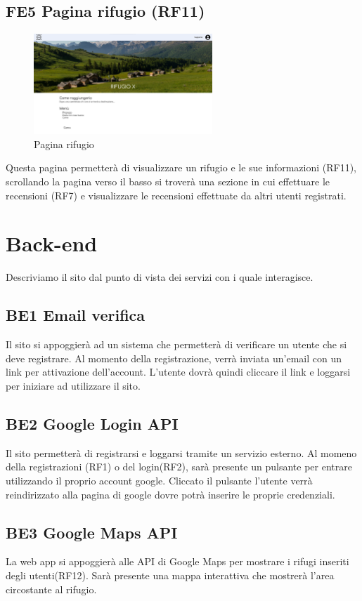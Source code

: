 \documentclass[a4paper,12pt]{article}
\begin{document}
\subsection*{FE5 Pagina rifugio (RF11)}
\begin{figure}[H]
   \centering
    \includegraphics[width=0.6\textwidth]{img/Pagina rifugio.png}
    \caption{Pagina rifugio}
\end{figure}
Questa pagina permetterà di visualizzare un rifugio e le sue informazioni (RF11), scrollando la pagina verso il basso si troverà una sezione in cui effettuare le recensioni (RF7) e visualizzare le recensioni effettuate da altri utenti registrati.


\newpage
\section{Back-end}

Descriviamo il sito dal punto di vista dei servizi con i quale interagisce.

\subsection*{BE1 Email verifica}
Il sito si appoggierà ad un sistema che permetterà di verificare un utente che si deve registrare. Al momento della registrazione, verrà inviata un'email con un link per attivazione dell'account. L'utente dovrà quindi cliccare il link e loggarsi per iniziare ad utilizzare il sito.


\subsection*{BE2 Google Login API}
Il sito permetterà di registrarsi e loggarsi tramite un servizio esterno. Al momeno della registrazioni (RF1) o del login(RF2), sarà presente un pulsante per entrare utilizzando il proprio account google. Cliccato il pulsante l'utente verrà reindirizzato alla pagina di google dovre potrà inserire le proprie credenziali.

\subsection*{BE3 Google Maps API}
La web app si appoggierà alle API di Google Maps per mostrare i rifugi inseriti degli utenti(RF12). Sarà presente una mappa interattiva che mostrerà l'area circostante al rifugio.
\end{document}
